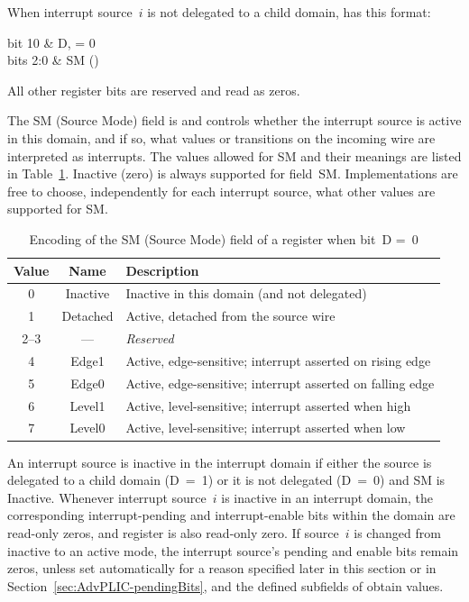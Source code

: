 When interrupt source~$i$ is not delegated to a child domain,
 has this format:\nopagebreak
\begin{displayLinesTable}[l@{\qquad}l]
bit 10   & D, = 0 \\
bits 2:0 & SM (\WARL) \\
\end{displayLinesTable}
All other register bits are reserved and read as zeros.

The SM (Source Mode) field is {\WARL} and controls whether the
interrupt source is active in this domain, and if so, what values or
transitions on the incoming wire are interpreted as interrupts.
The values allowed for SM and their meanings are listed in
Table~\ref{tab:AdvPLIC-sourcecfg-SM}.
Inactive (zero) is always supported for field~SM.
Implementations are free to choose, independently for each interrupt
source, what other values are supported for SM.

\begin{table}[h!]
\begin{center}
\begin{tabular}{|c|c|l|}
\hline
Value & Name   & Description \\
\hline
\hline
0    & Inactive & Inactive in this domain (and not delegated) \\
1    & Detached & Active, detached from the source wire \\
2--3 & ---      & \emph{Reserved} \\
4    & Edge1    & Active, edge-sensitive; interrupt asserted on rising edge \\
5    & Edge0    & Active, edge-sensitive; interrupt asserted on falling edge \\
6    & Level1   & Active, level-sensitive; interrupt asserted when high \\
7    & Level0   & Active, level-sensitive; interrupt asserted when low \\
\hline
\end{tabular}
\end{center}
\caption{%
Encoding of the SM (Source Mode) field of a  register when
bit~D =~0%
}
\label{tab:AdvPLIC-sourcecfg-SM}
\end{table}

An interrupt source is inactive in the interrupt domain if either the
source is delegated to a child domain (D~=~1) or it is not delegated
(D~=~0) and SM is Inactive.
Whenever interrupt source~$i$ is inactive in an interrupt domain,
the corresponding interrupt-pending and interrupt-enable bits within
the domain are read-only zeros, and register  is also
read-only zero.
If source~$i$ is changed from inactive to an active mode, the
interrupt source's pending and enable bits remain zeros, unless set
automatically for a reason specified later in this section or in
Section~\ref{sec:AdvPLIC-pendingBits}, and the defined subfields
of  obtain {\unspecified} values.

